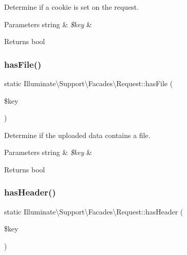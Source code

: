 Determine if a cookie is set on the request.


\begin{DoxyParams}[1]{Parameters}
string & {\em \$key} & \\
\hline
\end{DoxyParams}
\begin{DoxyReturn}{Returns}
bool 
\end{DoxyReturn}
\mbox{\label{class_illuminate_1_1_support_1_1_facades_1_1_request_a14261036d9d8192ae6bc760d7d1a354d}} 
\subsubsection{\texorpdfstring{has\+File()}{hasFile()}}
{\footnotesize\ttfamily static Illuminate\textbackslash{}\+Support\textbackslash{}\+Facades\textbackslash{}\+Request\+::has\+File (\begin{DoxyParamCaption}\item[{}]{\$key }\end{DoxyParamCaption})\hspace{0.3cm}{\ttfamily [static]}}

Determine if the uploaded data contains a file.


\begin{DoxyParams}[1]{Parameters}
string & {\em \$key} & \\
\hline
\end{DoxyParams}
\begin{DoxyReturn}{Returns}
bool 
\end{DoxyReturn}
\mbox{\label{class_illuminate_1_1_support_1_1_facades_1_1_request_a56135a65dcaa5b1aa7b33112630af0cd}} 
\subsubsection{\texorpdfstring{has\+Header()}{hasHeader()}}
{\footnotesize\ttfamily static Illuminate\textbackslash{}\+Support\textbackslash{}\+Facades\textbackslash{}\+Request\+::has\+Header (\begin{DoxyParamCaption}\item[{}]{\$key }\end{DoxyParamCaption})\hspace{0.3cm}{\ttfamily [static]}}

